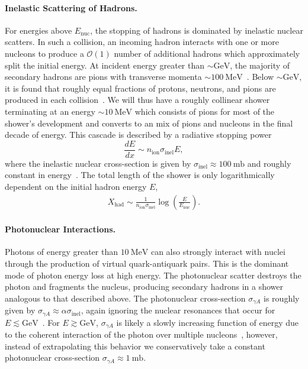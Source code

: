 \documentclass[preprintnumbers,amsmath,amssymb,prd,superscriptaddress]{revtex4}
\newcommand{\OO}{\mathcal{O}}
\newcommand{\GeV}{\text{GeV}}
\newcommand{\MeV}{\text{MeV}}
\newcommand{\mbn}{\text{mb}} %
\newcommand{\x}[1]{\ensuremath{\text{#1}}} %
\newcommand{\ion}{\text{ion}}
\newcommand{\inel}{\text{inel}}
\def\r{\right)}
\def\l{\left(}
\begin{document}
\begin{appendices}
\paragraph{Inelastic Scattering of Hadrons.}
For energies above $E_\text{nuc}$, the stopping of hadrons is dominated by inelastic nuclear scatters.
In such a collision, an incoming hadron interacts with one or more nucleons to produce a $\OO(1)$ number of additional hadrons which approximately split the initial energy.
At incident energy greater than $\sim \GeV$, the majority of secondary hadrons are pions with transverse momenta $\sim 100 ~\MeV$~\cite{Tavernier}.
Below $\sim \GeV$, it is found that roughly equal fractions of protons, neutrons, and pions are produced in each collision~\cite{Pionnuclear}.
We will thus have a roughly collinear shower terminating at an energy $\sim 10~\MeV$ which consists of pions for most of the shower's development and converts to an mix of pions and nucleons in the final decade of energy.
This cascade is described by a radiative stopping power
\begin{equation}
\label{eq:nucshower}
  \frac{dE}{dx} \sim n_\ion \sigma_\inel E,
\end{equation}
where the inelastic nuclear cross-section is given by $\sigma_\inel \approx 100 ~\mbn$ and roughly constant in energy~\cite{Tavernier}.
The total length of the shower is only logarithmically dependent on the initial hadron energy $E$,
\begin{align}
    X_\x{had} \sim \frac{1}{n_\ion \sigma_\inel} \log\l\frac{E}{E_\text{nuc}}\r.
\end{align}

\paragraph{Photonuclear Interactions.}
Photons of energy greater than $10 ~\MeV$ can also strongly interact with nuclei through the production of virtual quark-antiquark pairs.
This is the dominant mode of photon energy loss at high energy.
The photonuclear scatter destroys the photon and fragments the nucleus, producing secondary hadrons in a shower analogous to that described above.
The photonuclear cross-section $\sigma_{\gamma A}$ is roughly given by $\sigma_{\gamma A} \approx \alpha \sigma_\inel$, again ignoring the nuclear resonances that occur for $E \lesssim \GeV$~\cite{Tavernier}.
For $E \gtrsim \GeV$, $\sigma_{\gamma A}$ is likely a slowly increasing function of energy due to the coherent interaction of the photon over multiple nucleons~\cite{Gerhardt:2010bj}, however, instead of extrapolating this behavior we conservatively take a constant photonuclear cross-section $\sigma_{\gamma A} \approx 1~\mbn$.


\end{appendices}
\end{document}
